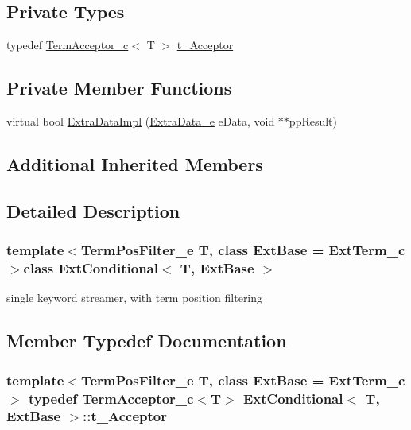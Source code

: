 \subsection*{Private Types}
\begin{DoxyCompactItemize}
\item 
typedef \hyperlink{classTermAcceptor__c}{Term\-Acceptor\-\_\-c}$<$ T $>$ \hyperlink{classExtConditional_a08f04a7f9532f6b28beb31c7eab2f558}{t\-\_\-\-Acceptor}
\end{DoxyCompactItemize}
\subsection*{Private Member Functions}
\begin{DoxyCompactItemize}
\item 
virtual bool \hyperlink{classExtConditional_a328facf878c476420e15565c0bb7edfa}{Extra\-Data\-Impl} (\hyperlink{sphinxint_8h_ad3985aadf484a2191d9758968e2dfa88}{Extra\-Data\-\_\-e} e\-Data, void $\ast$$\ast$pp\-Result)
\end{DoxyCompactItemize}
\subsection*{Additional Inherited Members}


\subsection{Detailed Description}
\subsubsection*{template$<$Term\-Pos\-Filter\-\_\-e T, class Ext\-Base = Ext\-Term\-\_\-c$>$class Ext\-Conditional$<$ T, Ext\-Base $>$}

single keyword streamer, with term position filtering 

\subsection{Member Typedef Documentation}
\hypertarget{classExtConditional_a08f04a7f9532f6b28beb31c7eab2f558}{
\subsubsection[{t\-\_\-\-Acceptor}]{\setlength{\rightskip}{0pt plus 5cm}template$<$Term\-Pos\-Filter\-\_\-e T, class Ext\-Base = Ext\-Term\-\_\-c$>$ typedef {\bf Term\-Acceptor\-\_\-c}$<$T$>$ {\bf Ext\-Conditional}$<$ T, Ext\-Base $>$\-::{\bf t\-\_\-\-Acceptor}\hspace{0.3cm}{\ttfamily [private]}}}\label{classExtConditional_a08f04a7f9532f6b28beb31c7eab2f558}


